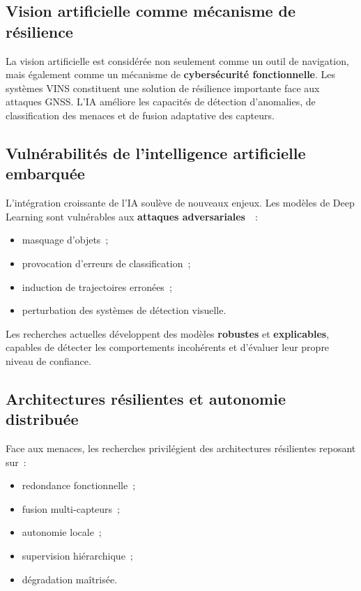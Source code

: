 \documentclass[12pt, a4paper, twoside, openright]{report}
\begin{document}
\subsection{Vision artificielle comme mécanisme de résilience}

La vision artificielle est considérée non seulement comme un outil de navigation, mais également comme un mécanisme de \textbf{cybersécurité fonctionnelle}. Les systèmes VINS constituent une solution de résilience importante face aux attaques GNSS. L'IA améliore les capacités de détection d'anomalies, de classification des menaces et de fusion adaptative des capteurs.

\subsection{Vulnérabilités de l'intelligence artificielle embarquée}

L'intégration croissante de l'IA soulève de nouveaux enjeux. Les modèles de Deep Learning sont vulnérables aux \textbf{attaques adversariales}~\cite{arxiv2018adversarial}~:

\begin{itemize}
    \item masquage d'objets~;
    \item provocation d'erreurs de classification~;
    \item induction de trajectoires erronées~;
    \item perturbation des systèmes de détection visuelle.
\end{itemize}

Les recherches actuelles développent des modèles \textbf{robustes} et \textbf{explicables}, capables de détecter les comportements incohérents et d'évaluer leur propre niveau de confiance.

\subsection{Architectures résilientes et autonomie distribuée}

Face aux menaces, les recherches privilégient des architectures résilientes reposant sur~:

\begin{itemize}
    \item redondance fonctionnelle~;
    \item fusion multi-capteurs~;
    \item autonomie locale~;
    \item supervision hiérarchique~;
    \item dégradation maîtrisée.
\end{itemize}
\end{document}
